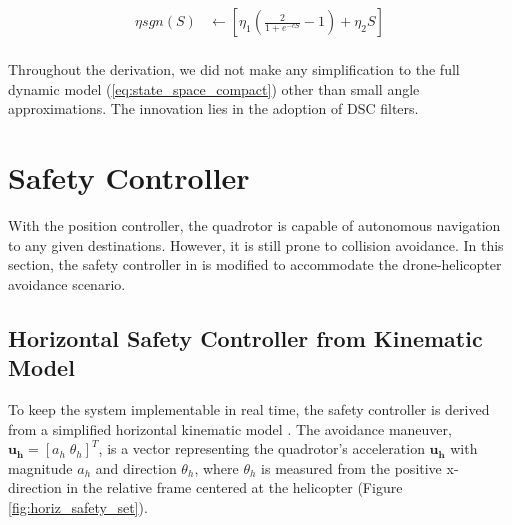 \documentclass[journal,11pt,onecolumn,draftclsnofoot,]{IEEEtran}
\begin{document}
\begin{equation}
\label{eq:sgn_smoothed}
\begin{split}
\eta sgn(S) &\leftarrow \left[ \eta_1\left( \frac{2}{1+e^{-cS}}-1 \right) + \eta_2 S \right] \\
\end{split}
\end{equation}

Throughout the derivation, we did not make any simplification to the full dynamic model (\ref{eq:state_space_compact}) other than small angle approximations. The innovation lies in the adoption of DSC filters.

\section{\textbf{Safety Controller}}

With the position controller, the quadrotor is capable of autonomous navigation to any given destinations. However, it is still prone to collision avoidance. In this section, the safety controller in \cite{hoffmann2008decentralized} is modified to accommodate the drone-helicopter avoidance scenario.

\subsection{Horizontal Safety Controller from Kinematic Model} \label{sec:horiz_safety_controller_derivation}

To keep the system implementable in real time, the safety controller is derived from a simplified horizontal kinematic model \cite{hoffmann2008decentralized}. The avoidance maneuver, $\boldsymbol{u_h}=[a_h \; \theta_h ]^T$, is a vector representing the quadrotor's acceleration $\boldsymbol{u_h}$ with magnitude $a_h$ and direction $\theta_h$, where $\theta_h$ is measured from the positive x-direction in the relative frame centered at the helicopter (Figure \ref{fig:horiz_safety_set}).

\end{document}
